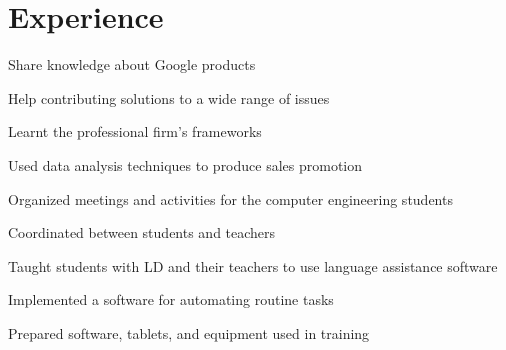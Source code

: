 \documentclass[]{deedy-resume-openfont}
\begin{document}
\hfill
\begin{minipage}[t]{0.66\textwidth} 



\section{Experience}
\vspace{\topsep} %
\begin{tightemize}
\item Share knowledge about Google products
\item Help contributing solutions to a wide range of issues
\end{tightemize}
\sectionsep

\begin{tightemize}
\item Learnt the professional firm's frameworks
\item Used data analysis techniques to produce sales promotion
\end{tightemize}
\sectionsep

\begin{tightemize}
\item Organized meetings and activities for the computer engineering students
\item Coordinated between students and teachers
\end{tightemize}
\sectionsep

\begin{tightemize}
\item Taught students with LD and their teachers to use language assistance software
\item Implemented a software for automating routine tasks
\item Prepared software, tablets, and equipment used in training
\end{tightemize}
\sectionsep


\end{minipage}
\end{document}
